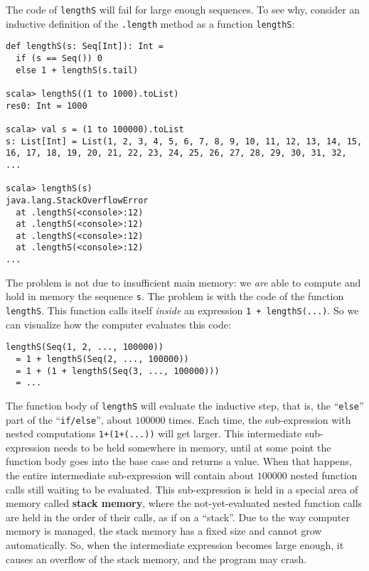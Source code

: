 The code of \lstinline!lengthS!
will fail for large enough sequences. To see why, consider an inductive
definition of the \lstinline!.length!
method as a function \lstinline!lengthS!:
\begin{lstlisting}
def lengthS(s: Seq[Int]): Int =
  if (s == Seq()) 0
  else 1 + lengthS(s.tail)

scala> lengthS((1 to 1000).toList)
res0: Int = 1000

scala> val s = (1 to 100000).toList
s: List[Int] = List(1, 2, 3, 4, 5, 6, 7, 8, 9, 10, 11, 12, 13, 14, 15, 16, 17, 18, 19, 20, 21, 22, 23, 24, 25, 26, 27, 28, 29, 30, 31, 32, ...

scala> lengthS(s)
java.lang.StackOverflowError
  at .lengthS(<console>:12)
  at .lengthS(<console>:12)
  at .lengthS(<console>:12)
  at .lengthS(<console>:12)
...
\end{lstlisting}
The problem is not due to insufficient main memory: we \emph{are}
able to compute and hold in memory the sequence \lstinline!s!.
The problem is with the code of the function \lstinline!lengthS!.
This function calls itself \emph{inside} an expression \lstinline!1 + lengthS(...)!.
So we can visualize how the computer evaluates this code: 
\begin{lstlisting}
lengthS(Seq(1, 2, ..., 100000))
  = 1 + lengthS(Seq(2, ..., 100000))
  = 1 + (1 + lengthS(Seq(3, ..., 100000)))
  = ...
\end{lstlisting}
The function body of \lstinline!lengthS!
will evaluate the inductive step, that is, the ``\lstinline!else!''
part of the ``\lstinline!if/else!'',
about $100000$ times. Each time, the sub-expression with nested computations
\lstinline!1+(1+(...))!
will get larger. This intermediate sub-expression needs to be held
somewhere in memory, until at some point the function body goes into
the base case and returns a value. When that happens, the entire intermediate
sub-expression will contain about $100000$ nested function calls
still waiting to be evaluated. This sub-expression is held in a special
area of memory called \textbf{stack memory},
where the not-yet-evaluated nested function calls are held in the
order of their calls, as if on a ``stack''. Due to the way computer
memory is managed, the stack memory has a fixed size and cannot grow
automatically. So, when the intermediate expression becomes large
enough, it causes an overflow of the stack memory, and the program
may crash.

